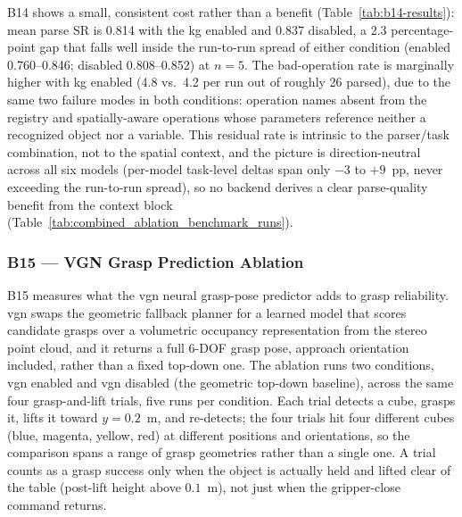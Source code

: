 \documentclass[
     12pt,
     a4paper,
     BCOR=10mm,
     DIV=14,
     listof=totoc,
     bibliography=totoc,
     parskip,
     twoside,
     headsepline
     ]{scrreprt}
\begin{document}
B14 shows a small, consistent cost rather than a benefit (Table~\ref{tab:b14-results}): mean parse SR is 0.814 with the \gls{kg} enabled and 0.837 disabled, a 2.3 percentage-point gap that falls well inside the run-to-run spread of either condition (enabled 0.760--0.846; disabled 0.808--0.852) at $n=5$. The bad-operation rate is marginally higher with \gls{kg} enabled (4.8 vs.\ 4.2 per run out of roughly 26 parsed), due to the same two failure modes in both conditions: operation names absent from the registry and spatially-aware operations whose parameters reference neither a recognized object nor a variable. This residual rate is intrinsic to the parser/task combination, not to the spatial context, and the picture is direction-neutral across all six models (per-model task-level deltas span only $-3$ to $+9$~pp, never exceeding the run-to-run spread), so no backend derives a clear parse-quality benefit from the context block (Table~\ref{tab:combined_ablation_benchmark_runs}).

\subsubsection{B15 --- VGN Grasp Prediction Ablation}\label{sec:results-vgn}
B15 measures what the \gls{vgn} neural grasp-pose predictor adds to grasp reliability. \gls{vgn} swaps the geometric fallback planner for a learned model that scores candidate grasps over a volumetric occupancy representation from the stereo point cloud, and it returns a full 6-DOF grasp pose, approach orientation included, rather than a fixed top-down one. The ablation runs two conditions, \gls{vgn} enabled and \gls{vgn} disabled (the geometric top-down baseline), across the same four grasp-and-lift trials, five runs per condition. Each trial detects a cube, grasps it, lifts it toward $y = 0.2$~m, and re-detects; the four trials hit four different cubes (blue, magenta, yellow, red) at different positions and orientations, so the comparison spans a range of grasp geometries rather than a single one. A trial counts as a grasp success only when the object is actually held and lifted clear of the table (post-lift height above $0.1$~m), not just when the gripper-close command returns.
\end{document}
